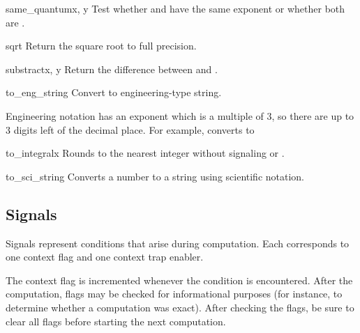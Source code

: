 \begin{methoddesc}{same_quantum}{x, y}
  Test whether  and  have the same exponent or whether both are
  .
\end{methoddesc}

\begin{methoddesc}{sqrt}{}
  Return the square root to full precision.
\end{methoddesc}                    

\begin{methoddesc}{substract}{x, y}
  Return the difference between  and .
\end{methoddesc}
 
\begin{methoddesc}{to_eng_string}{}
  Convert to engineering-type string.

  Engineering notation has an exponent which is a multiple of 3, so there
  are up to 3 digits left of the decimal place.  For example, converts
   to 
\end{methoddesc}  

\begin{methoddesc}{to_integral}{x}                  
  Rounds to the nearest integer without signaling 
  or .                                        
\end{methoddesc} 

\begin{methoddesc}{to_sci_string}{}
  Converts a number to a string using scientific notation.
\end{methoddesc} 



\subsection{Signals \label{decimal-signals}}

Signals represent conditions that arise during computation.
Each corresponds to one context flag and one context trap enabler.

The context flag is incremented whenever the condition is encountered.
After the computation, flags may be checked for informational
purposes (for instance, to determine whether a computation was exact).
After checking the flags, be sure to clear all flags before starting
the next computation.

